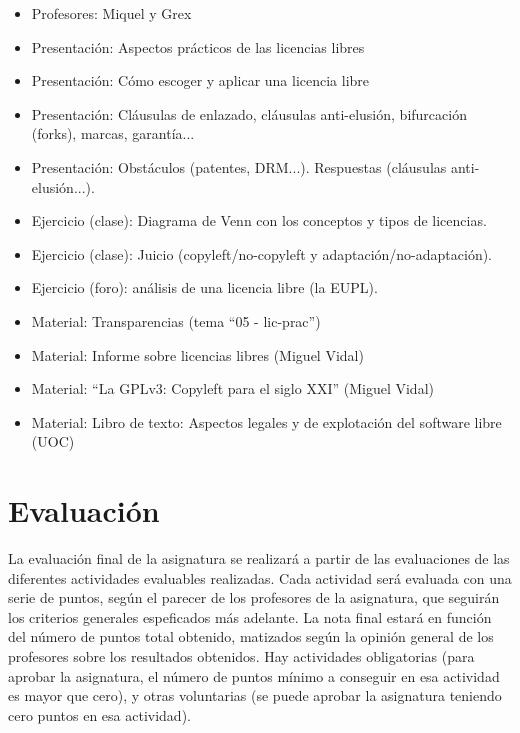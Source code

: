 \documentclass[a4paper,12pt]{article}
\begin{document}
 \begin{itemize}
 \item Profesores: Miquel y Grex
 \item Presentación: Aspectos prácticos de las licencias libres
 \item Presentación: Cómo escoger y aplicar una licencia libre
 \item Presentación: Cláusulas de enlazado, cláusulas anti-elusión, bifurcación (forks), marcas, garantía...
 \item Presentación: Obstáculos (patentes, DRM...). Respuestas (cláusulas anti-elusión...). 
 \item Ejercicio (clase): Diagrama de Venn con los conceptos y tipos de licencias.  \\
 \item Ejercicio (clase): Juicio (copyleft/no-copyleft y adaptación/no-adaptación).  \\
 \item Ejercicio (foro): análisis de una licencia libre (la EUPL).  \\
 \item Material: Transparencias (tema ``05 - lic-prac'')
 \item Material: Informe sobre licencias libres (Miguel Vidal)
 \item Material: ``La GPLv3: Copyleft para el siglo XXI'' (Miguel Vidal)
 \item Material: Libro de texto: Aspectos legales y de explotación del software libre (UOC)
 \end{itemize}


\section{Evaluación}

La evaluación final de la asignatura se realizará a partir de las evaluaciones de las diferentes actividades evaluables realizadas. Cada actividad será evaluada con una serie de puntos, según el parecer de los profesores de la asignatura, que seguirán los criterios generales espeficados más adelante. La nota final estará en función del número de puntos total obtenido, matizados según la opinión general de los profesores sobre los resultados obtenidos. Hay actividades obligatorias (para aprobar la asignatura, el número de puntos mínimo a conseguir en esa actividad es mayor que cero), y otras voluntarias (se puede aprobar la asignatura teniendo cero puntos en esa actividad).
\end{document}
